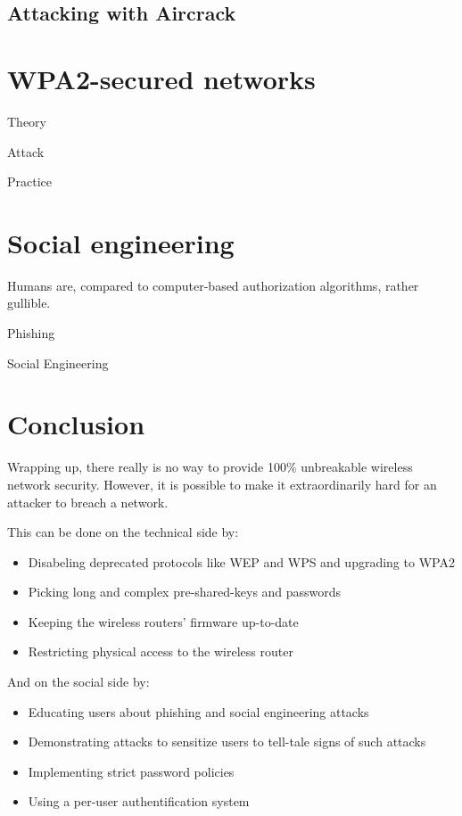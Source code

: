 
\subsection{Attacking with Aircrack}

\section{WPA2-secured networks}

Theory

Attack

Practice

\section{Social engineering}\label{sec:attackuser}

Humans are, compared to computer-based authorization algorithms, rather gullible. 

Phishing

Social Engineering

\section{Conclusion}

Wrapping up, there really is no way to provide 100\% unbreakable wireless network security. However, it is possible to make it extraordinarily hard for an attacker to breach a network. 

This can be done on the technical side by:

\begin{itemize}

\item{Disabeling deprecated protocols like WEP and WPS and upgrading to WPA2}

\item{Picking long and complex pre-shared-keys and passwords}

\item{Keeping the wireless routers' firmware up-to-date}

\item{Restricting physical access to the wireless router}

\end{itemize}

And on the social side by:

\begin{itemize}

\item{Educating users about phishing and social engineering attacks}

\item{Demonstrating attacks to sensitize users to tell-tale signs of such attacks}

\item{Implementing strict password policies}

\item{Using a per-user authentification system}

\end{itemize}